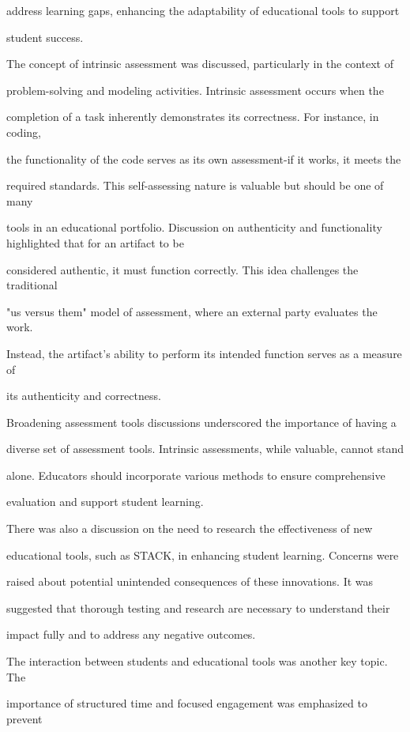 \documentclass[11pt]{article}
\begin{document}
address learning gaps, enhancing the adaptability of educational tools to support

student success.

The concept of intrinsic assessment was discussed, particularly in the context of

problem-solving and modeling activities. Intrinsic assessment occurs when the

completion of a task inherently demonstrates its correctness. For instance, in coding,

the functionality of the code serves as its own assessment-if it works, it meets the

required standards. This self-assessing nature is valuable but should be one of many

tools in an educational portfolio. Discussion on authenticity and functionality highlighted that for an artifact to be

considered authentic, it must function correctly. This idea challenges the traditional

"us versus them" model of assessment, where an external party evaluates the work.

Instead, the artifact's ability to perform its intended function serves as a measure of

its authenticity and correctness.

Broadening assessment tools discussions underscored the importance of having a

diverse set of assessment tools. Intrinsic assessments, while valuable, cannot stand

alone. Educators should incorporate various methods to ensure comprehensive

evaluation and support student learning.

There was also a discussion on the need to research the effectiveness of new

educational tools, such as STACK, in enhancing student learning. Concerns were

raised about potential unintended consequences of these innovations. It was

suggested that thorough testing and research are necessary to understand their

impact fully and to address any negative outcomes.

The interaction between students and educational tools was another key topic. The

importance of structured time and focused engagement was emphasized to prevent
\end{document}
